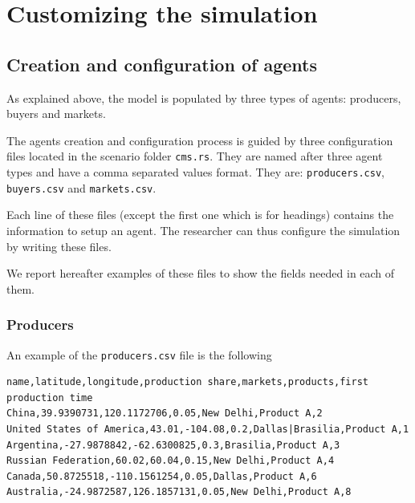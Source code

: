 \documentclass{article}
\begin{document}
\vskip2mm





\section{Customizing the simulation}\label{sec:initialization}
\subsection{Creation and configuration of agents}

As explained above, the model is populated by three types of agents: producers, buyers and markets.

The agents creation and configuration process is guided by three configuration files located in the scenario folder \verb+cms.rs+.
They are named after three agent types and have a comma separated values format. They are: \verb+producers.csv+, \verb+buyers.csv+ and \verb+markets.csv+.

Each line of these files (except the first one which is for headings) contains the information to setup an agent. The researcher can thus configure the simulation by writing these files.

We report hereafter examples of these files to show the fields needed in each of them.

\subsubsection{Producers}
An example of the \verb+producers.csv+ file is the following 

\begin{verbatim}
name,latitude,longitude,production share,markets,products,first production time
China,39.9390731,120.1172706,0.05,New Delhi,Product A,2
United States of America,43.01,-104.08,0.2,Dallas|Brasilia,Product A,1
Argentina,-27.9878842,-62.6300825,0.3,Brasilia,Product A,3
Russian Federation,60.02,60.04,0.15,New Delhi,Product A,4
Canada,50.8725518,-110.1561254,0.05,Dallas,Product A,6
Australia,-24.9872587,126.1857131,0.05,New Delhi,Product A,8

\end{verbatim}
\end{document}
